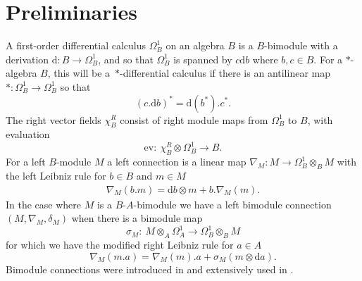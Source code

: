 \documentclass[pdftex]{sigma}
\numberwithin{equation}{section}
\newcommand{\ev}{\mathrm{ev}}
\newcommand{\extd}{\mathrm{d}}
\newcommand{\tens}{\mathop{\otimes}}
\newcommand{\<}{\langle}
\renewcommand{\>}{\rangle}
\begin{document}
\section{Preliminaries}\label{Prelim}
A first-order differential calculus $ \Omega_{B}^{1} $ on an algebra $ B $ is a $ B$-bimodule with a derivation \linebreak \mbox{$ \extd \colon B \rightarrow \Omega_{B}^{1} $}, and so that $ \Omega_{B}^{1} $ is spanned by $ c \extd b $ where $ b, c \in B$. For a $ * $-algebra $B$, this will be a~$*$-differential calculus if there is an antilinear map $ *\colon \Omega_{B}^{1} \rightarrow \Omega_{B}^{1}$ so that
\[(c. \extd b)^{*}=\extd (b^{*}). c^{*}.\]
The right vector fields $ \chi_{B}^{R} $ consist of right module maps from $ \Omega_{B}^{1} $ to $ B $, with evaluation
\[ \ev\colon \ \chi_{B}^{R} \tens \Omega_{B}^{1} \rightarrow B.
\] For a left $ B $-module $ M $ a left connection is a linear map $ \nabla_{M}\colon M \rightarrow \Omega_{B}^{1} \tens_{B} M$ with the left Leibniz rule for $ b\in B $ and $ m \in M $
\begin{align}\label{e73}
	\nabla_{M}(b. m)=\extd b \tens m+b. \nabla_{M}(m).
\end{align}
In the case where $ M$ is a $ B$-$A $-bimodule we have a left bimodule connection $ (M, \nabla_{M}, \delta_{M}) $ when there is a bimodule map
\[\sigma_{M}\colon \ M \tens_{A} \Omega_{A}^{1} \rightarrow \Omega_{B}^{1} \tens_{B} M\]
for which we have the modified right Leibniz rule for $ a\in A $
\[\nabla_{M}(m. a)=\nabla_{M}(m). a +\sigma_{M}(m \tens \extd a). \]
Bimodule connections were introduced in \cite{DuboisMasson,DuboisMichor,Mourad} and extensively used in \cite{FioreMadore, Madore}.
\end{document}

